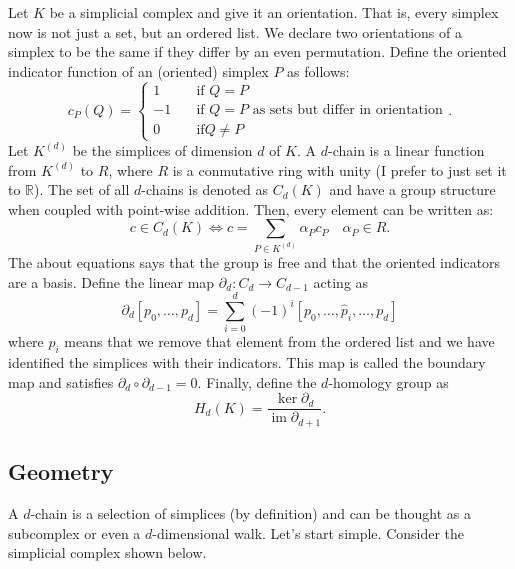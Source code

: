 \documentclass{article}
\newcommand{\R}{\mathbb R}
\DeclareMathOperator{\im}{im}
\begin{document}
Let \(K\) be a simplicial complex and give it an orientation. That is, every
simplex now is not just a set, but an ordered list. We declare two orientations
of a simplex to be the same if they differ by an even permutation. Define the
oriented indicator function of an (oriented) simplex \(P\) as follows:
\begin{displaymath}
  c_P(Q) =
  \left\{
  \begin{aligned}
    1 &\quad \textrm{if } Q=P\\
    -1 &\quad \textrm{if } Q=P\text{ as sets but differ in orientation}\\
    0 &\quad \textrm{if} Q\ne P
  \end{aligned}.
  \right.
\end{displaymath}
Let \(K^{(d)}\) be the simplices of dimension \(d\) of \(K\). A \(d\)-chain is
a linear function from \(K^{(d)}\) to \(R\), where \(R\) is a conmutative ring with unity
(I prefer to just set it to \(\R\)).
The set of all \(d\)-chains is denoted as \(C_d(K)\) and have a group structure
when coupled with point-wise addition. Then, every element can be written as:
\begin{displaymath}
  c\in C_d(K) \iff c = \sum_{P\in K^{(d)}} \alpha_P c_P
  \quad \alpha_P\in R.
\end{displaymath}
The about equations says that the group is free and that the oriented indicators are a basis.
Define the linear map \(\partial_d\colon C_d \to C_{d-1}\) acting as
\begin{displaymath}
  \partial_d [p_0, \ldots, p_d] = \sum_{i=0}^{d} (-1)^{i} [p_0, \ldots, \hat p_i, \ldots, p_d]
\end{displaymath}
where \(\hat p_i\) means that we remove that element from the ordered list and we have identified
the simplices with their indicators.
This map is called the boundary map and satisfies \(\partial_{d} \circ
\partial_{d-1} = 0\). Finally, define the \(d\)-homology group as
\begin{displaymath}
  H_d(K) = \frac{\ker \partial_{d}}{\im \partial_{d+1}}.
\end{displaymath}

\subsection{Geometry}

A \(d\)-chain is a selection of simplices (by definition) and can be thought as a 
subcomplex or even a \(d\)-dimensional walk. Let's start simple. Consider the simplicial
complex shown below.
\end{document}
